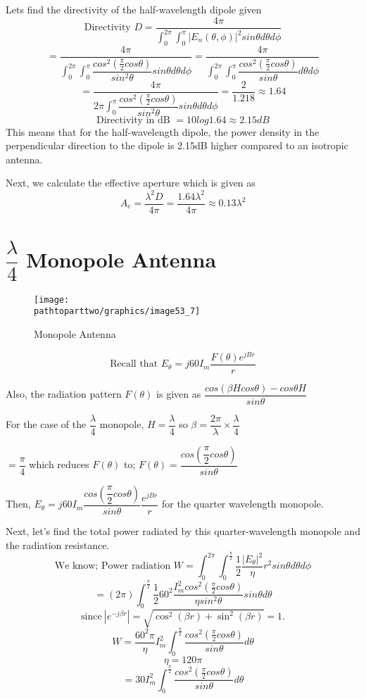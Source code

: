 Lets find the directivity of the half-wavelength dipole given 
\[ \text{Directivity }D = \dfrac{4\pi}{\int_{0}^{2\pi}\int_{0}^{\pi}|E_n(\theta ,\phi)|^2sin\theta d\theta d\phi} \]
\[ = \dfrac{4\pi}{\int_{0}^{2\pi}\int_{0}^{\pi}\dfrac{cos^2(\frac{\pi}{2}cos\theta)}{sin^2\theta}sin\theta d\theta d\phi} = \dfrac{4\pi}{\int_{0}^{2\pi}\int_{0}^{\pi}\dfrac{cos^2(\frac{\pi}{2}cos\theta)}{sin\theta} d\theta d\phi} \]
\[ = \dfrac{4\pi}{2\pi\int_{0}^{\pi}\dfrac{cos^2(\frac{\pi}{2}cos\theta)}{sin^2\theta}sin\theta d\theta d\phi} = \dfrac{2}{1.218} \approx 1.64 \]
\[ \text{Directivity in dB } = 10log1.64 \approx 2.15dB \]
This means that for the half-wavelength dipole, the power density in the perpendicular direction to the dipole is 2.15dB higher compared to an isotropic antenna.

Next, we calculate the effective aperture which is given as 
\[A_e = \dfrac{\lambda^2 D}{4\pi} = \dfrac{1.64\lambda^2}{4\pi} \approx 0.13\lambda^2 \]

\section{$\dfrac{\lambda}{4}$ Monopole Antenna}
\begin{figure}[h]
\centering
\texttt{[image: \\pathtoparttwo/graphics/image53\_7]}
\caption{Monopole Antenna}
\label{fig:fig7}
\end{figure}
\begin{equation*}
\text{Recall that }E_\theta = j60I_m \frac{F(\theta)e^{jBr}}{r}
\end{equation*}
\begin{center}
Also, the radiation pattern $F(\theta)$ is given as $\dfrac{cos(\beta H cos\theta) - cos\theta H}{sin \theta}$

For the case of the $\dfrac{\lambda}{4}$ monopole, $H = \dfrac{\lambda}{4}$ so $\beta = \dfrac{2\pi}{\lambda} \times \dfrac{\lambda}{4}$

$ = \dfrac{\pi}{4} $ which reduces $F(\theta)$ to; $F(\theta) = \dfrac{cos (\dfrac{\pi}{2} cos\theta)}{sin\theta}$

Then, $E_\theta = j60I_m \dfrac{cos (\dfrac{\pi}{2} cos\theta)}{sin\theta} \dfrac{e^{jBr}}{r}$ for the quarter wavelength monopole.
\end{center}
Next, let's find the total power radiated by this quarter-wavelength monopole and the radiation resistance. 
\[ \text{We know; Power radiation } W = \int_0^{2\pi}\int_{0}^{\frac{\pi}{2}} \frac{1}{2}\frac{|E_\theta|^2}{\eta}r^2sin\theta d\theta d\phi \]
\[ = (2\pi)\int_{0}^{\frac{\pi}{2}} \frac{1}{2} 60^2 \frac{I_m^2cos^2(\frac{\pi}{2}cos\theta)}{\eta sin^2\theta}sin\theta d\theta \]
$$\text{since}\ |e^{-j\beta r}| = \sqrt{\cos^2(\beta r) + \sin^2(\beta r)} = 1.$$
\[ W = \frac{60^2\pi}{\eta} I_m^2 \int_{0}^{\frac{\pi}{2}} \frac{cos^2(\frac{\pi}{2}cos\theta)}{sin\theta}d\theta \]
\[ \eta = 120\pi \]
\[ = 30I_m^2 \int_{0}^{\frac{\pi}{2}}\dfrac{cos^2(\frac{\pi}{2}cos\theta)}{sin\theta}d\theta \]

